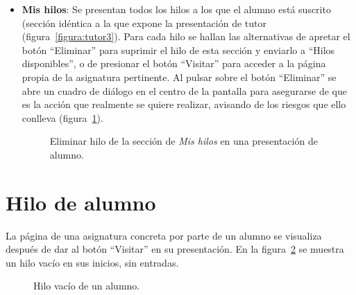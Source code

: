 \documentclass[a4paper, 12pt]{book}
\begin{document}
\begin{itemize}
  \item {\bfseries Mis hilos}: Se presentan todos los hilos a los que el alumno est\'a suscrito (secci\'on id\'entica a la que expone la presentaci\'on de 
  tutor (figura~\ref{figura:tutor3}). Para cada hilo se hallan las alternativas de apretar el bot\'on ``Eliminar'' para suprimir el hilo de esta secci\'on y 
  enviarlo a ``Hilos disponibles'', o de presionar el bot\'on ``Visitar'' para acceder a la p\'agina propia de la asignatura pertinente. Al pulsar sobre el 
  bot\'on ``Eliminar'' se abre un cuadro de di\'alogo en el centro de la pantalla para asegurarse de que es la acci\'on que realmente se quiere realizar, 
  avisando de los riesgos que ello conlleva (figura~\ref{figura:alumno3}).
  \begin{figure}[htbp] 
    \centering
    \caption{Eliminar hilo de la secci\'on de \textit{Mis hilos} en una presentaci\'on de alumno.}
    \label{figura:alumno3}
  \end{figure}
\end{itemize} 


\section{Hilo de alumno}
\label{app:hiloalumno}
La p\'agina de una asignatura concreta por parte de un alumno se visualiza despu\'es de dar al bot\'on ``Visitar'' en su presentaci\'on. En la 
figura~\ref{figura:hiloalumno} se muestra un hilo vac\'io en sus inicios, sin entradas.
\begin{figure}[htbp] 
  \centering
  \caption{Hilo vac\'io de un alumno.}
  \label{figura:hiloalumno}
\end{figure}
\end{document}
